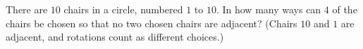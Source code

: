 There are $10$ chairs in a circle, numbered $1$ to $10$. In how many ways can $4$ of the chairs be chosen so that no two chosen chairs are adjacent? (Chairs $10$ and $1$ are adjacent, and rotations count as different choices.)

